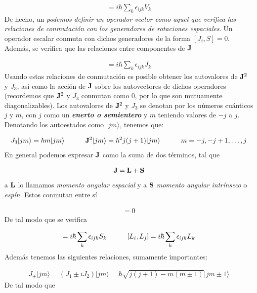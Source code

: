 \begin{eqnarray}
	[J_i,,V_j] = i\hbar \sum_k \epsilon_{ijk} V_k
\end{eqnarray}
De hecho, un \textit{podemos definir un operador vector como aquel que verifica las relaciones de conmutación con los generadores de rotaciones espaciales}. Un operador escalar conmuta con dichos generadores de la forma $[J_i,S]=0$. Además, se verifica que las relaciones entre componentes de $\mathbf{J}$

\begin{eqnarray}
	[J_i,J_j] = i\hbar \sum_k \epsilon_{ijk} J_k
\end{eqnarray}
Usando estas relaciones de conmutación es posible obtener los autovalores de $\mathbf{J}^2$ y $J_3$, así como la acción de $\mathbf{J}$ sobre los autovectores de dichos operadores (recordemos que $\mathbf{J}^2$ y $J_3$ conmutan como 0, por lo que son mutuamente diagonalizables). Los autovalores de $\mathbf{J}^2$ y $J_3$ se denotan por los números cuánticos $j$ y $m$, con $j$ como un \textit{\textbf{enerto o semientero}} y $m$ teniendo valores de $-j$ a $j$. Denotando los autoestados como $|jm\rangle$, tenemos que:

\begin{eqnarray}
	J_3 |jm\rangle = \hbar m |jm\rangle \quad \quad \quad \mathbf{J}^2 |jm\rangle = \hbar^2 j(j+1) |jm\rangle \quad \quad \quad m=-j,-j+1,\ldots,j
\end{eqnarray}
En general podemos expresar $\mathbf{J}$ como la suma de dos términos, tal que

\begin{eqnarray}
	\mathbf{J} = \mathbf{L} + \mathbf{S}
\end{eqnarray}
a $\mathbf{L}$ lo llamamos \textit{momento angular espacial} y a $\mathbf{S}$ \textit{momento angular intrínseco} o \textit{espín}. Estos conmutan entre sí 

\begin{eqnarray}
	[S_i,L_j] = 0
\end{eqnarray}
De tal modo que se verifica

\begin{eqnarray}
	[S_i,S_j] = i \hbar \sum_k \epsilon_{ijk} S_k \tquad [L_i,L_j] = i \hbar \sum_k \epsilon_{ijk} L_k
\end{eqnarray}
Además tenemos las siguientes relaciones, sumamente importantes:

\begin{eqnarray}
J_{\pm}|jm\rangle = (J_1 \pm i J_2) |jm\rangle = \hbar \sqrt{j(j+1)-m(m\pm1)} |jm\pm1\rangle
\end{eqnarray}
De tal modo que 

